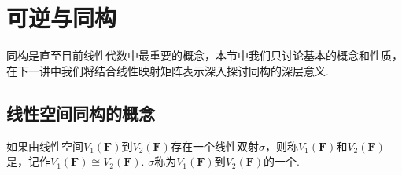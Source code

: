 \section{可逆与同构}

同构是直至目前线性代数中最重要的概念，本节中我们只讨论基本的概念和性质，在下一讲中我们将结合线性映射矩阵表示深入探讨同构的深层意义.

\subsection{线性空间同构的概念}

\begin{definition}[同构] 
    如果由线性空间$V_1(\mathbf{F})$到$V_2(\mathbf{F})$存在一个线性双射$\sigma$，则称$V_1(\mathbf{F})$和$V_2(\mathbf{F})$是，记作$V_1(\mathbf{F}) \cong V_2(\mathbf{F})$. $\sigma$称为$V_1(\mathbf{F})$到$V_2(\mathbf{F})$的一个.
\end{definition}

